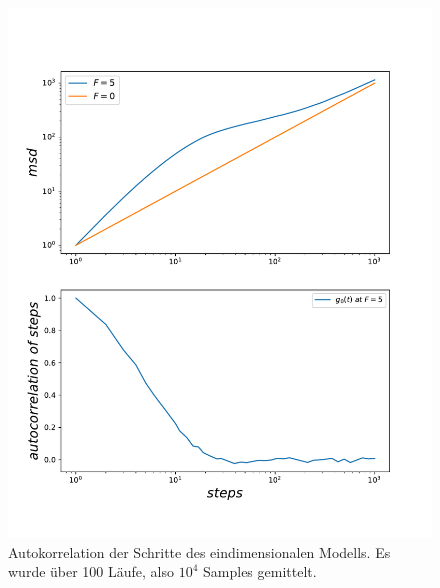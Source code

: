 \documentclass[a4paper, 12pt]{report}
\begin{document}
\begin{figure}[h!]
	\centering
	\includegraphics[scale=0.7]{onedescp.pdf}
	\caption{Autokorrelation der Schritte des eindimensionalen Modells. Es wurde über 100 Läufe, also $10^4$ Samples gemittelt.}
\end{figure}
\end{document}
